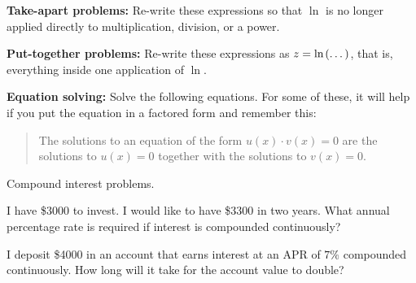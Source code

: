 
\textbf{Take-apart problems:}
Re-write these expressions so that $\ln$ is no longer applied directly to multiplication, division, or a power.

\begin{multicols}{2}
 \begin{ProblemSet}[pencil space=3.5in]
 \end{ProblemSet}
\end{multicols}
\newpage

\textbf{Put-together problems:}
Re-write these expressions as $z = \mathrm{ln}\hspace{-0.1ex}\left(\dots\right)$, that is, everything inside one application of $\ln$.

\begin{multicols}{2}
 \begin{ProblemSet}[pencil space=4in]
 \end{ProblemSet}
\end{multicols}
\newpage

\textbf{Equation solving:}
Solve the following equations.
For some of these, it will help if you put the equation in a factored form and remember this:
\begin{quote}
 The solutions to an equation of the form $u(x) \cdot v(x) = 0$ are the solutions to $u(x) = 0$ together with the solutions to $v(x) = 0$.
\end{quote}

\begin{multicols}{2}
 \begin{ProblemSet}[pencil space=4in]

 \end{ProblemSet}
\end{multicols}

\newpage

Compound interest problems.

\begin{ProblemSet}[pencil space=4in]
 \begin{Problem}
  I have \$3000 to invest.
  I would like to have \$3300 in two years.
  What annual percentage rate is required if interest is compounded continuously?
 \end{Problem}

 \begin{Problem}
  I deposit \$4000 in an account that earns interest at an APR of $7\%$ compounded continuously.
  How long will it take for the account value to double?
 \end{Problem}
\end{ProblemSet}


